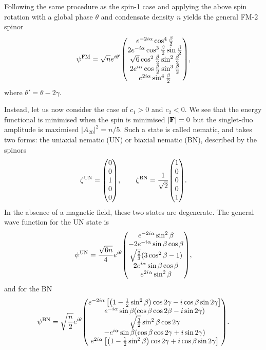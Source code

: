 Following the same procedure as the spin-1 case and applying the above spin
rotation with a global phase \(\theta \) and condensate density \(n\) yields the
general FM-2 spinor
\begin{equation}\label{eq: FM-2-representative-spinor}
    \psi^\mathrm{FM} = \sqrt{n}e^{i\theta'}\mqty(
    e^{-2i\alpha} \cos^4\frac{\beta}{2} \\
    2e^{-i\alpha}\cos^3\frac{\beta}{2}\sin \frac{\beta}{2} \\
    \sqrt{6} \cos^2\frac{\beta}{2} \sin^2\frac{\beta}{2} \\
    2e^{i\alpha}\cos\frac{\beta}{2} \sin^3\frac{\beta}{2} \\
    e^{2i\alpha} \sin^4\frac{\beta}{2}
    ),
\end{equation}
where \(\theta'=\theta-2\gamma \).

Instead, let us now consider the case of \(c_1 > 0\) and \(c_2 < 0\).
We see that the energy functional is minimised when the spin is minimised
\(|\vb{F}| = 0\) but the singlet-duo amplitude is maximised
\(|A_{20}|^2 = n/5\).
Such a state is called nematic, and takes two forms: the uniaxial nematic (UN)
or biaxial nematic (BN), described by the spinors
\begin{equation}
    \zeta^\mathrm{UN} = \mqty(0 \\ 0 \\ 1 \\ 0 \\ 0), \qquad
    \zeta^\mathrm{BN} = \frac{1}{\sqrt{2}}\mqty(1 \\ 0 \\0 \\ 0 \\ 1).
\end{equation}
In the absence of a magnetic field, these two states are degenerate.
The general wave function for the UN state is
\begin{equation}\label{eq: UN-representative-spinor}
    \psi^\mathrm{UN} = \frac{\sqrt{6n}}{4}e^{i\theta}\mqty(
    e^{-2i\alpha} \sin^2\beta \\
    -2e^{-i\alpha} \sin\beta \cos\beta \\
    \sqrt{\frac{2}{3}}(3\cos^2\beta - 1) \\
    2e^{i\alpha} \sin\beta \cos\beta \\
    e^{2i\alpha} \sin^2\beta
    ),
\end{equation}
and for the BN
\begin{equation}\label{eq: BN-representative-spinor}
    \psi^\mathrm{BN} = \sqrt{\frac{n}{2}}e^{i\theta} \mqty(
    e^{-2i\alpha}\left[\left(1 - \frac{1}{2}\sin^2\beta\right)\cos 2\gamma
        - i\cos\beta\sin 2\gamma\right] \\
    e^{-i\alpha}\sin\beta(\cos\beta\cos 2\beta - i\sin 2\gamma) \\
    \sqrt{\frac{3}{2}}\sin^2\beta \cos 2\gamma \\
    -e^{i\alpha}\sin\beta(\cos\beta\cos 2\gamma + i\sin 2\gamma) \\
    e^{2i\alpha}\left[\left(1 - \frac{1}{2}\sin^2\beta\right)\cos 2\gamma
        + i\cos\beta\sin 2\gamma\right]
    ).
\end{equation}

